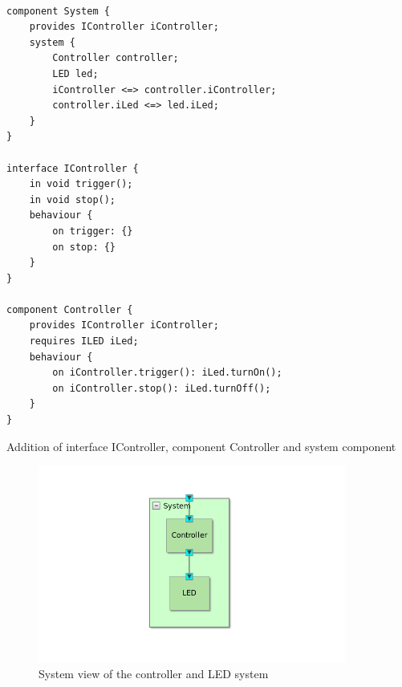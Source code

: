 \documentclass[12pt]{scrreprt}
\begin{document}
\begin{listing}[!ht]
\begin{verbatim}
               
component System {
	provides IController iController;
	system {
		Controller controller;
		LED led;
		iController <=> controller.iController;
		controller.iLed <=> led.iLed;
	}
}

interface IController {
	in void trigger();
	in void stop();
	behaviour {
		on trigger: {}
		on stop: {}
	}
}

component Controller {
	provides IController iController;
	requires ILED iLed;
	behaviour {
		on iController.trigger(): iLed.turnOn();
		on iController.stop(): iLed.turnOff();
	}
}

\end{verbatim}
\caption{Addition of interface IController, component Controller and system component}
\label{Addition of interface IController, component Controller and system component}
\end{listing}
               

\begin{figure}[H]
    \centering
    \includegraphics[width=0.9\textwidth]{Figures/theoretical_background/sys_view.png}
    \caption{System view of the controller and LED system}
    \label{System view of the controller and led system}
\end{figure}
\end{document}
